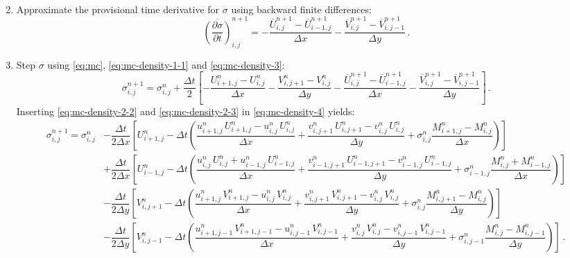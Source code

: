 \documentclass{article}
\numberwithin{equation}{section}
\begin{document}
\begin{enumerate}
\begin{subequations}
\begin{align}
					\end{align}
				\end{subequations}
			\item Approximate the provisional time derivative for $\sigma$ using backward finite differences:
				\begin{equation}
					\label{eq:mc-density-3}
					\overline{\left( \dfrac{\partial \sigma}{\partial t} \right)}_{i,j}^{n+1} = - \dfrac{\overline{U}_{i,j}^{n+1} - \overline{U}_{i-1,j}^{n+1}}{\Delta x} - \dfrac{\overline{V}_{i,j}^{n+1} - \overline{V}_{i,j-1}^{n+1}}{\Delta y} \, .
				\end{equation}
			\item Step $\sigma$ using \eqref{eq:mc}, \eqref{eq:mc-density-1-1} and \eqref{eq:mc-density-3}:
				\begin{equation}
					\label{eq:mc-density-4}
					\sigma_{i,j}^{n+1} = \sigma_{i,j}^n + \dfrac{\Delta t}{2} \left[ - \dfrac{U_{i+1,j}^n - U_{i,j}^n}{\Delta x} - \dfrac{V_{i,j+1}^n - V_{i,j}^n}{\Delta y} - \dfrac{\overline{U}_{i,j}^{n+1} - \overline{U}_{i-1,j}^{n+1}}{\Delta x} - \dfrac{\overline{V}_{i,j}^{n+1} - \overline{V}_{i,j-1}^{n+1}}{\Delta y} \right] \, .
				\end{equation}
				Inserting \eqref{eq:mc-density-2-2} and \eqref{eq:mc-density-2-3} in \eqref{eq:mc-density-4} yields:
				\begin{equation}
					\label{eq:mc-density-5}
					\begin{aligned}
						\sigma_{i,j}^{n+1} = \sigma_{i,j}^n & - \dfrac{\Delta t}{2 \Delta x} \left[ U_{i+1,j}^n - \Delta t \left( \dfrac{u_{i+1,j}^n \, U_{i+1,j}^n - u_{i,j}^n \, U_{i,j}^n}{\Delta x} + \dfrac{v_{i,j+1}^n \, U_{i,j+1}^n - v_{i,j}^n \, U_{i,j}^n}{\Delta y} + \sigma_{i,j}^n \dfrac{M_{i+1,j}^n - M_{i,j}^n}{\Delta x} \right) \right] \\
						& + \dfrac{\Delta t}{2 \Delta x} \left[ U_{i-1,j}^n - \Delta t \left( \dfrac{u_{i,j}^n \, U_{i,j}^n + u_{i-1,j}^n \, U_{i-1,j}^n}{\Delta x} + \dfrac{v_{i-1,j+1}^n \, U_{i-1,j+1}^n - v_{i-1,j}^n \, U_{i-1,j}^n}{\Delta y} + \sigma_{i-1,j}^n \dfrac{M_{i,j}^n + M_{i-1,j}^n}{\Delta x} \right) \right] \\
						& - \dfrac{\Delta t}{2 \Delta y} \left[ V_{i,j+1}^n - \Delta t \left( \dfrac{u_{i+1,j}^n \, V_{i+1,j}^n - u_{i,j}^n \, V_{i,j}^n}{\Delta x} + \dfrac{v_{i,j+1}^n \, V_{i,j+1}^n - v_{i,j}^n \, V_{i,j}^n}{\Delta y} + \sigma_{i,j}^n \dfrac{M_{i,j+1}^n - M_{i,j}^n}{\Delta y} \right) \right] \\
						& - \dfrac{\Delta t}{2 \Delta y} \left[ V_{i,j-1}^n - \Delta t \left( \dfrac{u_{i+1,j-1}^n \, V_{i+1,j-1}^n - u_{i,j-1}^n \, V_{i,j-1}^n}{\Delta x} + \dfrac{v_{i,j}^n \, V_{i,j}^n - v_{i,j-1}^n \, V_{i,j-1}^n}{\Delta y} + \sigma_{i,j-1}^n \dfrac{M_{i,j}^n - M_{i,j-1}^n}{\Delta y} \right) \right] \, .

\end{aligned}
\end{equation}
\end{enumerate}
\end{document}
